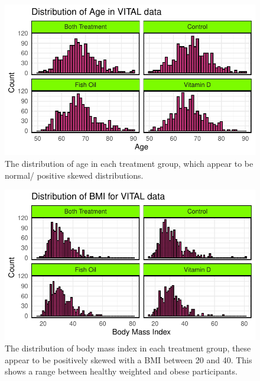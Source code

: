 \documentclass{article}
\begin{document}
\begin{figure}

{\centering \includegraphics{Final_Report_files/figure-latex/unnamed-chunk-16-1} 

}

\caption{The distribution of age in each treatment group, which appear to be normal/ positive skewed distributions.}\label{fig:unnamed-chunk-16}
\end{figure}

\begin{figure}

{\centering \includegraphics{Final_Report_files/figure-latex/unnamed-chunk-17-1} 

}

\caption{The distribution of body mass index in each treatment group, these appear to be positively skewed with a BMI between 20 and 40. This shows a range between healthy weighted and obese participants.}\label{fig:unnamed-chunk-17}
\end{figure}
\end{document}

